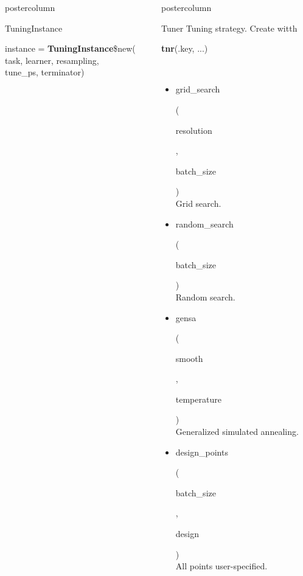 \documentclass{beamer}
\newlength{\columnheight} %
\newcommand{\codeinline}[1]{\begin{codeboxinline}#1\end{codeboxinline}}
\begin{document}
\begin{frame}[fragile]{}
\begin{columns}
\begin{column}{.245\textwidth}
\begin{beamercolorbox}[center]{postercolumn}
\begin{minipage}{.98\textwidth}
{\begin{myblock}{TuningInstance}
\begin{codeboxmultiline}[width=20cm]
								instance = \textbf{TuningInstance}\$new(\\
								\hspace*{1ex}task, learner, resampling,\\
								\hspace*{1ex}tune\_ps, terminator)
							\end{codeboxmultiline}
						\end{myblock}
						\vfill}
				\end{minipage}
			\end{beamercolorbox}
		\end{column}
		\begin{column}{.245\textwidth}
			\begin{beamercolorbox}[center]{postercolumn}
				\begin{minipage}{.98\textwidth}
					\parbox[t][\columnheight]{\textwidth}{
						\begin{myblock}{Tuner}
                            Tuning strategy. Create witth \codeinline{\textbf{tnr}(.key, ...)}
							\\
							\begin{itemize}
								\item \codeinline{grid\_search}
								(\codeinline{resolution}, \codeinline{batch\_size})\\
								Grid search.
								\item \codeinline{random\_search}
								(\codeinline{batch\_size})\\
								Random search.
								\item \codeinline{gensa}
								(\codeinline{smooth}, \codeinline{temperature})\\
								Generalized simulated annealing.
								\item \codeinline{design\_points}
								(\codeinline{batch\_size }, \codeinline{design})\\
								All points user-specified.
							\end{itemize}
							\vspace{0.5cm}

\end{myblock}}
\end{minipage}
\end{beamercolorbox}
\end{column}
\end{columns}
\end{frame}
\end{document}
